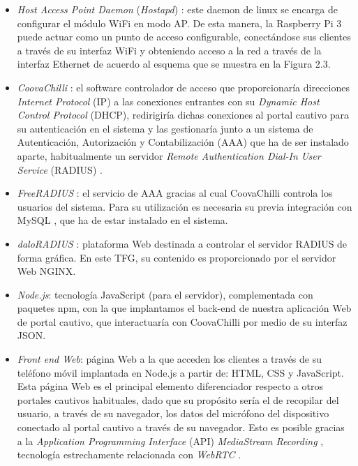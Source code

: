 \begin{itemize}
\item \emph{Host Access Point Daemon} (\emph{\acrshort{Hostapd}}) \cite{hostapdDoc}: este daemon de linux se encarga de configurar el módulo WiFi en modo \acrshort{AP}. De esta manera, la Raspberry Pi 3 puede actuar como un punto de acceso configurable, conectándose sus clientes a través de su interfaz \acrshort{WiFi} y obteniendo acceso a la red a través de la interfaz Ethernet de acuerdo al esquema que se muestra en la Figura 2.3.
\item \emph{CoovaChilli} \cite{ChilliGitHub}: el software controlador de acceso que proporcionaría direcciones \emph{Internet Protocol} (\acrshort{IP}) a las conexiones entrantes con su \emph{Dynamic Host Control Protocol} (\acrshort{DHCP}), redirigiría dichas conexiones al portal cautivo para su autenticación en el sistema y las gestionaría junto a un sistema de Autenticación, Autorización y Contabilización (\acrshort{AAA}) que ha de ser instalado aparte, habitualmente un servidor \emph{Remote Authentication Dial-In User Service} (\acrshort{RADIUS}) \cite{RADIUS}.
\item \emph{FreeRADIUS} \cite{FreeRADIUSDoc}: el servicio de \acrshort{AAA} gracias al cual CoovaChilli controla los usuarios del sistema. Para su utilización es necesaria su previa integración con My\acrshort{SQL} \cite{PHPMySQLJavaScript}, que ha de estar instalado en el sistema.
\item \emph{daloRADIUS} \cite{daloRADIUS1}: plataforma Web destinada a controlar el servidor RADIUS de forma gráfica. En este TFG, su contenido es proporcionado por el servidor Web NGINX.
\item \emph{Node.js}: tecnología JavaScript (para el servidor), complementada con paquetes \acrshort{npm}, con la que implantamos el back-end de nuestra aplicación Web de portal cautivo, que interactuaría con CoovaChilli por medio de su interfaz \acrshort{JSON}.
\item \emph{Front end Web}: página Web a la que acceden los clientes a través de su teléfono móvil implantada en Node.js a partir de: \acrshort{HTML}, \acrshort{CSS} y JavaScript. Esta página Web es el principal elemento diferenciador respecto a otros portales cautivos habituales, dado que su propósito sería el de recopilar del usuario, a través de su navegador, los datos del micrófono del dispositivo conectado al portal cautivo a través de su navegador. Esto es posible gracias a la \emph{Application Programming Interface} (\acrshort{API}) \emph{MediaStream Recording} \cite{MediaStreamRecordingAPI}, tecnología estrechamente relacionada con \emph{\acrshort{WebRTC}} \cite{LibroWebRTC1}.
\end{itemize}

